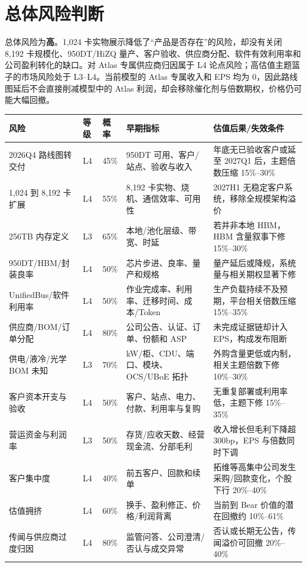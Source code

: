\section{总体风险判断}

总体风险为\textbf{高}。1,024 卡实物展示降低了“产品是否存在”的风险，却没有关闭 8,192 卡规模化、950DT/HiZQ 量产、客户验收、供应商分配、软件有效利用率和公司盈利转化的缺口。对 Atlas 专属供应商归因属于 L4 论点风险；高估值主题篮子的市场风险处于 L3--L4。当前模型的 Atlas 专属收入和 EPS 均为 0，因此路线图延后不会直接削减模型中的 Atlas 利润，却会移除催化剂与倍数期权，价格仍可能大幅回撤。

\begin{exhibitbox}[核心风险矩阵]
\begin{longtable}{L{3.2cm}L{1.3cm}L{1.4cm}L{3.7cm}L{4.0cm}}
\toprule
\textbf{风险} & \textbf{等级} & \textbf{概率} & \textbf{早期指标} & \textbf{估值后果/失效条件}\\
\midrule
\endhead
2026Q4 路线图转交付 & L4 & 45\% & 950DT 可用、客户/站点、验收与收入 & 年底无已验收客户或延至 2027Q1 后，主题倍数压缩 15\%--30\%\\
1,024 到 8,192 卡扩展 & L4 & 55\% & 8,192 卡实物、烧机、通信效率、可用性 & 2027H1 无稳定客户系统，移除全规模架构溢价\\
256TB 内存定义 & L3 & 65\% & 本地/池化层级、带宽、时延 & 若并非本地 HBM，HBM 含量叙事下修 15\%--30\%\\
950DT/HBM/封装良率 & L4 & 50\% & 芯片步进、良率、量产和规格 & 量产延后或降规，系统量与相关期权显著下修\\
UnifiedBus/软件利用率 & L4 & 50\% & 作业完成率、利用率、迁移时间、成本/Token & 生产负载持续不及预期，平台相关倍数压缩 15\%--35\%\\
供应商/BOM/订单分配 & L4 & 80\% & 公司公告、认证、订单、份额和 ASP & 未完成证据链却计入 EPS，构成发布阻断\\
供电/液冷/光学 BOM 未知 & L3 & 70\% & kW/柜、CDU、端口、模块、OCS/UBoE 拓扑 & 外购含量更低或内制，相关主题倍数下修 10\%--30\%\\
客户资本开支与验收 & L4 & 50\% & 客户、站点、电力、付款、利用率与复购 & 无重复部署或利用率低，主题下修 15\%--35\%\\
营运资金与利润率 & L3 & 50\% & 存货/应收天数、经营现金流、分部毛利 & 收入增长但毛利下降超 300bp，EPS 与倍数同时下调\\
客户集中度 & L4 & 40\% & 前五客户、回款和续单 & 拓维等高集中公司发生采购/回款变化，个股下行 20\%--40\%\\
估值拥挤 & L4 & 60\% & 换手、盈利修正、价格/利润背离 & 当前到 Bear 价值的潜在回撤约 10\%--61\%\\
传闻与供应商过度归因 & L4 & 80\% & 监管问答、公司澄清/否认与成交异常 & 否认或长期无公告，传闻溢价可回撤 20\%--40\%\\
\bottomrule
\end{longtable}
\end{exhibitbox}

